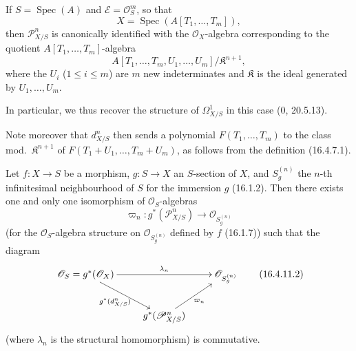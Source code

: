 \begin{corollary}[16.4.10]
\label{IV.16.4.10}
If $S=\operatorname{Spec}(A)$ and $\mathscr{E}=\mathcal{O}_S^m$, so that
\[
  X=\operatorname{Spec}(A[T_1,\ldots,T_m]),
\]
then $\mathscr{P}_{X/S}^n$ is canonically identified with the
$\mathcal{O}_X$-algebra corresponding to the quotient $A[T_1,\ldots,T_m]$-algebra
\[
  A[T_1,\ldots,T_m,U_1,\ldots,U_m]/\mathfrak{K}^{n+1},
\]
where the $U_i$ ($1\leq i\leq m$) are $m$ new indeterminates and
$\mathfrak{K}$ is the ideal generated by $U_1,\ldots,U_m$.
\end{corollary}

In particular, we thus recover the structure of $\Omega_{X/S}^1$ in this case
(0, 20.5.13).

Note moreover that $d_{X/S}^n$ then sends a polynomial
$F(T_1,\ldots,T_m)$ to the class mod.\ $\mathfrak{K}^{n+1}$ of
$F(T_1+U_1,\ldots,T_m+U_m)$, as follows from the definition (16.4.7.1).

\begin{proposition}[16.4.11]
\label{IV.16.4.11}
Let $f:X\to S$ be a morphism, $g:S\to X$ an $S$-section of $X$, and
$S_g^{(n)}$ the $n$-th infinitesimal neighbourhood of $S$ for the immersion $g$
(16.1.2). Then there exists one and only one isomorphism of
$\mathcal{O}_S$-algebras
\[
  \varpi_n:g^*(\mathscr{P}_{X/S}^n)\longrightarrow
  \mathcal{O}_{S_g^{(n)}}
  \tag{16.4.11.1}
  \label{IV.16.4.11.1}
\]
(for the $\mathcal{O}_S$-algebra structure on
$\mathcal{O}_{S_g^{(n)}}$ defined by $f$ (16.1.7)) such that the
diagram
\[
  \xymatrix{
    \mathcal{O}_S=g^*(\mathcal{O}_X)
      \ar[rr]^-{\lambda_n}\ar[dr]_-{g^*(d_{X/S}^n)}
      &&\mathcal{O}_{S_g^{(n)}}\\
    &g^*(\mathscr{P}_{X/S}^n)\ar[ur]_-{\varpi_n}
  }
  \tag{16.4.11.2}
  \label{IV.16.4.11.2}
\]
(where $\lambda_n$ is the structural homomorphism) is commutative.
\end{proposition}

